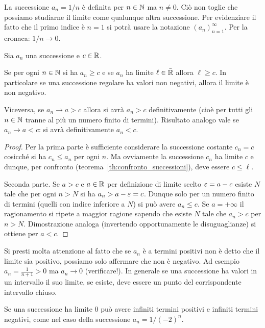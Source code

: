 \begin{example}
La successione $a_n = 1/n$ è definita per $n\in \mathbb N$ ma $n\neq 0$.
Ciò non toglie che possiamo studiarne il limite come qualunque altra
successione. Per evidenziare il fatto che il primo indice è $n=1$
si potrà usare la notazione $(a_n)_{n=1}^\infty$.
Per la cronaca: $1/n \to 0$.
\end{example}


\begin{corollary}
\mymark{***}%
%
%
%
Sia $a_n$ una successione e $c\in \mathbb R$.

Se per ogni $n\in \mathbb N$ si ha $a_n \ge c$ e se $a_n$ ha limite $\ell \in \bar {\mathbb R}$
allora $\ell \ge c$.
In particolare se una successione regolare ha valori non negativi,
allora il limite è non negativo.

Viceversa, se
$a_n \to a > c$ allora si avrà $a_n>c$ definitivamente
(cioè per tutti gli $n\in \mathbb N$ tranne al più un numero finito
di termini).
Risultato analogo vale se $a_n \to a < c$: si avrà
definitivamente $a_n < c$.
\end{corollary}
%
\begin{proof}
\mymark{**}
Per la prima parte
è sufficiente considerare la successione costante $c_n = c$
cosicché si ha $c_n \le a_n$ per ogni $n$. Ma ovviamente
la successione $c_n$ ha limite $c$ e dunque,
per confronto (teorema~\ref{th:confronto_successioni}),
deve essere $c\le \ell$.

Seconda parte. Se $a>c$ e $a\in \mathbb R$
per definizione di limite scelto $\varepsilon = a-c$ esiste $N$
tale che per ogni $n>N$ si ha $a_n > a-\varepsilon = c$.
Dunque solo per un numero finito di termini
(quelli con indice inferiore a $N$)
si può avere $a_n \le c$.
Se $a=+\infty$ il ragionamento
si ripete a maggior ragione sapendo che esiste $N$
tale che $a_n>c$ per $n>N$.
Dimostrazione analoga (invertendo opportunamente le disuguaglianze)
si ottiene per $a<c$.
\end{proof}

Si presti molta attenzione al fatto che se $a_n$ è a termini positivi
non è detto che il limite sia positivo, possiamo solo affermare
che non è negativo. Ad esempio $a_n = \frac{1}{n+1}>0$
ma $a_n \to 0$ (verificare!).
In generale se una successione ha valori in un intervallo il suo limite,
se esiste, deve essere un punto del corrispondente intervallo chiuso.

Se una successione ha limite $0$ può avere infiniti termini
positivi e infiniti termini negativi, come nel caso
della successione $a_n = 1/(-2)^n$.

